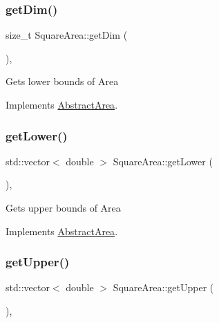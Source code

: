 \mbox{\label{class_square_area_a4c0aafc649029e04aeffbb69d70311c5}} 
\subsubsection{\texorpdfstring{get\+Dim()}{getDim()}}
{\footnotesize\ttfamily size\+\_\+t Square\+Area\+::get\+Dim (\begin{DoxyParamCaption}{ }\end{DoxyParamCaption})\hspace{0.3cm}{\ttfamily [override]}, {\ttfamily [virtual]}}

Gets lower bounds of Area 

Implements \hyperlink{class_abstract_area_af7e07218e25ae2864d82d829ff1c10b9}{Abstract\+Area}.

\mbox{\label{class_square_area_a251a1ca1fc74129265c9d53ed508bf22}} 
\subsubsection{\texorpdfstring{get\+Lower()}{getLower()}}
{\footnotesize\ttfamily std\+::vector$<$ double $>$ Square\+Area\+::get\+Lower (\begin{DoxyParamCaption}{ }\end{DoxyParamCaption})\hspace{0.3cm}{\ttfamily [override]}, {\ttfamily [virtual]}}

Gets upper bounds of Area 

Implements \hyperlink{class_abstract_area_a6f5b9321813c982b37810b97c2a90257}{Abstract\+Area}.

\mbox{\label{class_square_area_ae9e9fa4d73c245d00c9bce0786fdce5c}} 
\subsubsection{\texorpdfstring{get\+Upper()}{getUpper()}}
{\footnotesize\ttfamily std\+::vector$<$ double $>$ Square\+Area\+::get\+Upper (\begin{DoxyParamCaption}{ }\end{DoxyParamCaption})\hspace{0.3cm}{\ttfamily [override]}, {\ttfamily [virtual]}}

